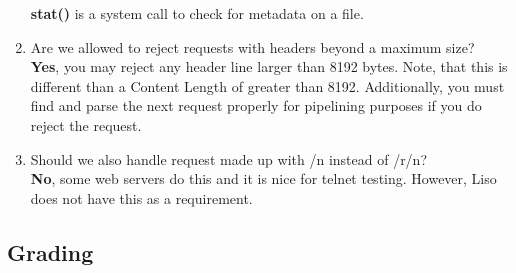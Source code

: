\begin{enumerate}
    \textbf{stat()} is a system call to check for metadata on a file. 
    \item Are we allowed to reject requests with headers beyond a maximum size?\\
    \textbf{Yes}, you may reject any header line larger than 8192 bytes. Note, that this is different than a Content Length of greater than 8192. Additionally, you must find and parse the next request properly for pipelining purposes if you do reject the request.
    \item Should we also handle request made up with /n instead of /r/n?\\
    \textbf{No}, some web servers do this and it is nice for telnet testing. However, Liso does not have this as a requirement.
\end{enumerate}

\subsection{Grading}

